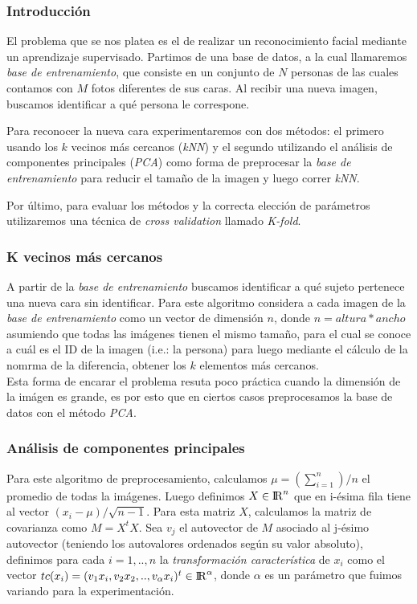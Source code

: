 \subsubsection*{Introducción}
\par El problema que se nos platea es el de realizar un reconocimiento facial mediante un aprendizaje supervisado. Partimos de una base de datos, a la cual llamaremos \textit{base de entrenamiento},
que consiste en un conjunto de $N$ personas de las cuales contamos con $M$ fotos diferentes de sus caras. Al recibir una nueva imagen, buscamos identificar
a qu\'e persona le correspone. 
\par Para reconocer la nueva cara experimentaremos con dos m\'etodos: el primero usando los $k$ vecinos m\'as cercanos (\textit{kNN}) y 
el segundo utilizando el an\'alisis de componentes principales (\textit{PCA}) como forma de preprocesar la \textit{base de entrenamiento} para reducir el 
tama\~{n}o de la imagen y luego correr \textit{kNN}. 
\par Por \'ultimo, para evaluar los m\'etodos y la correcta elecci\'on de par\'ametros utilizaremos una t\'ecnica de \textit{cross validation} llamado
\textit{K-fold}.

\subsubsection*{K vecinos m\'as cercanos}
\par A partir de la \textit{base de entrenamiento} buscamos identificar a qu\'e sujeto pertenece una nueva cara sin identificar.
Para este algoritmo considera a cada imagen de la \textit{base de entrenamiento} como un vector de dimensi\'on $n$, donde $n = altura*ancho$ asumiendo que
todas las im\'agenes tienen el mismo tama\~no, para el cual se conoce a cu\'al es el ID de la imagen (i.e.: la persona) para luego mediante el c\'alculo
de la nomrma de la diferencia, obtener los $k$ elementos m\'as cercanos.\\
Esta forma de encarar el problema resuta poco pr\'actica cuando la dimensi\'on de la im\'agen es grande, es por esto que en ciertos casos preprocesamos
la base de datos con el m\'etodo \textit{PCA}.

\subsubsection*{An\'alisis de componentes principales}
\par Para este algoritmo de preprocesamiento, calculamos $\mu = (\sum_{i=1}^{n})/n$ el promedio de todas la im\'agenes. Luego definimos $X \in {\rm I\!R}^n$ 
que en i-\'esima fila tiene al vector $(x_i -  \mu)/\sqrt{n -1}$. Para esta matriz $X$, calculamos la matriz de covarianza como $M = X^tX$.
Sea $v_j$ el autovector de $M$ asociado al j-\'esimo autovector (teniendo los autovalores ordenados seg\'un su valor absoluto), definimos para cada
$i = 1,..,n$ la \textit{transformaci\'on caracter\'istica} de $x_i$ como el vector $tc(x_i) = (v_1x_i,v_2x_2,..,v_\alpha x_i)^t \in {\rm I\!R}^\alpha$,
donde $\alpha$ es un par\'ametro que fuimos variando para la experimentaci\'on.

